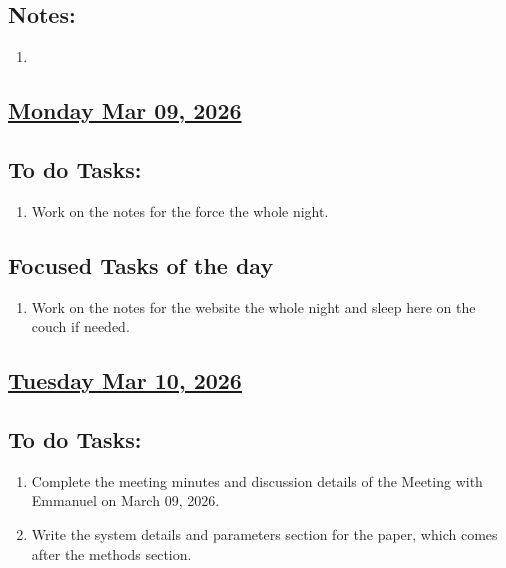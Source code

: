 \subsection*{Notes:}
\begin{enumerate}
    \item 
\end{enumerate}
\subsection*{\underline{Monday Mar 09, 2026}}
\subsection*{To do Tasks:}
\begin{enumerate}
    \item Work on the notes for the force the whole night. 
\end{enumerate}
\subsection*{Focused Tasks of the day}
\begin{enumerate}[\ding{212}]  
    \item Work on the notes for the website the whole night and sleep here on the couch if needed. 
\end{enumerate}
\subsection*{\underline{Tuesday Mar 10, 2026}}
\subsection*{To do Tasks:}
\begin{enumerate}
    \item Complete the meeting minutes and discussion details of the Meeting with Emmanuel on March 09, 2026.
    \item Write the system details and parameters section for the paper, which comes after the methods section.
\end{enumerate}
